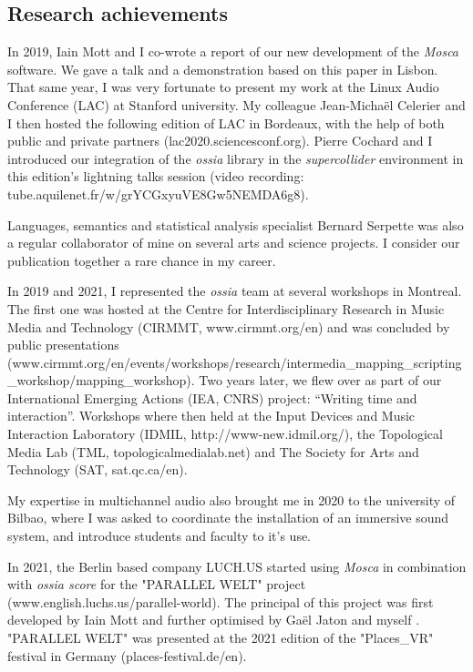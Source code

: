 \documentclass[journal,onecolumn]{IEEEtran}
\begin{document}
\subsection{Research achievements} %
In 2019, Iain Mott and I co-wrote a report of our new development of the \textit{Mosca} software. We gave a talk and a demonstration based on this paper\cite{mott:mosca} in Lisbon. That same year, I was very fortunate to present my work \cite{keller:linux} at the Linux Audio Conference (LAC) at Stanford university. My colleague Jean-Michaël Celerier and I then hosted the following edition of LAC in Bordeaux, with the help of both public and private partners (lac2020.sciencesconf.org). Pierre Cochard and I introduced our integration of the \textit{ossia} library in the \textit{supercollider} environment in this edition's lightning talks session (video recording: tube.aquilenet.fr/w/grYCGxyuVE8Gw5NEMDA6g8). 

Languages, semantics and statistical analysis specialist Bernard Serpette was also a regular collaborator of mine on several arts and science projects. I consider our publication together\cite{serpette:aleas} a rare chance in my career. 

In 2019 and 2021, I represented the \textit{ossia} team at several workshops in Montreal. The first one was hosted at the Centre for Interdisciplinary Research in Music Media and Technology (CIRMMT, www.cirmmt.org/en) and was concluded by public presentations (www.cirmmt.org/en/events/workshops/research/intermedia\_mapping\_scripting\_workshop/mapping\_workshop). Two years later, we flew over as part of our International Emerging Actions (IEA, CNRS) project: ``Writing time and interaction''. Workshops where then held at the Input Devices and Music Interaction Laboratory (IDMIL, http://www-new.idmil.org/), the Topological Media Lab (TML, topologicalmedialab.net) and The Society for Arts and Technology (SAT, sat.qc.ca/en).

My expertise in multichannel audio also brought me in 2020 to the university of Bilbao, where I was asked to coordinate the installation of an immersive sound system, and introduce students and faculty to it's use.

In 2021, the Berlin based company LUCH.US started using \textit{Mosca} in combination with \textit{ossia score} for the "PARALLEL WELT" project (www.english.luchs.us/parallel-world). The principal of this project was first developed by Iain Mott \cite{mott:botanica} and further optimised by Gaël Jaton and myself \cite{jaton:moscanica}. "PARALLEL WELT" was presented at the 2021 edition of the "Places\_VR" festival in Germany (places-festival.de/en).
\end{document}
